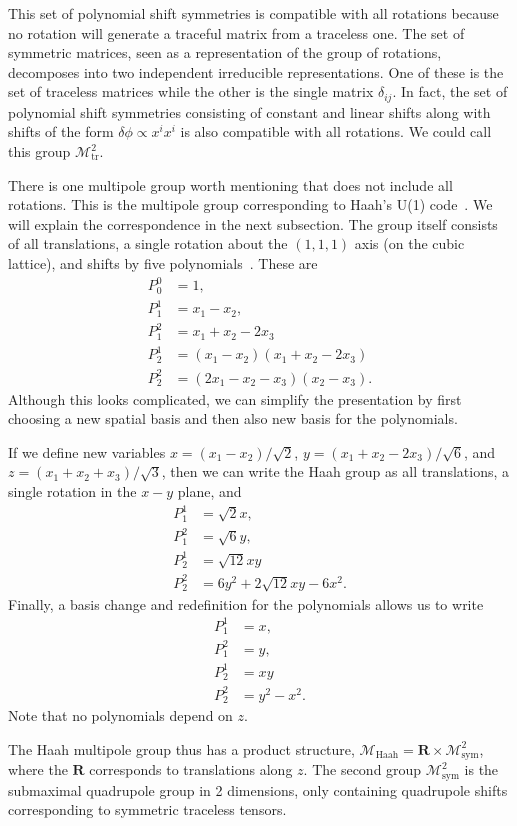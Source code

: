 \documentclass[pra,aps,twocolumn, amsfonts,amsmath,amssymb,nofootinbib,superscriptaddress]{revtex4-2}
\newcommand{\nn}{\nonumber\\}
\begin{document}
This set of polynomial shift symmetries is compatible with all rotations because no rotation will generate a traceful matrix from a traceless one. The set of symmetric matrices, seen as a representation of the group of rotations, decomposes into two independent irreducible representations. One of these is the set of traceless matrices while the other is the single matrix $\delta_{ij}$. In fact, the set of polynomial shift symmetries consisting of constant and linear shifts along with shifts of the form $\delta \phi \propto x^ix^i$ is also compatible with all rotations. We could call this group $\mathcal{M}^2_\text{tr}$.

There is one multipole group worth mentioning that does not include all rotations. This is the multipole group corresponding to Haah's U(1) code~\cite{Haah2017, BB, Gromov2019}. We will explain the correspondence in the next subsection. The group itself consists of all translations, a single rotation about the $(1,1,1)$ axis (on the cubic lattice), and shifts by five polynomials~\cite{Gromov2019}. These are
\begin{align}
P_0^0 &= 1, \nn
P_1^1 &= x_1 - x_2,\nn
P_1^2 &= x_1 + x_2 - 2x_3\nn
P_2^1 &= (x_1 - x_2) (x_1 + x_2 - 2x_3)\nn
P_2^2 &= (2x_1 - x_2 - x_3) (x_2 - x_3).
\end{align}
Although this looks complicated, we can simplify the presentation by first choosing a new spatial basis and then also new basis for the polynomials.

If we define new variables $x = (x_1 - x_2)/\sqrt{2}$, $y = (x_1 + x_2 - 2x_3)/\sqrt{6}$, and $z = (x_1 + x_2 + x_3)/\sqrt{3}$, then we can write the Haah group as all translations, a single rotation in the $x-y$ plane, and
\begin{align}
P_1^1 &= \sqrt{2} x , \nn
P_1^2 &= \sqrt{6} y, \nn
P_2^1 &= \sqrt{12} xy\nn
P_2^2 &= 6y^2 +2\sqrt{12} xy - 6x^2.
\end{align}
Finally, a basis change and redefinition for the polynomials allows us to write
\begin{align}
P_1^1 &= x , \nn
P_1^2 &= y, \nn
P_2^1 &= xy\nn
P_2^2 &= y^2 - x^2.
\end{align}
Note that no polynomials depend on $z$.

The Haah multipole group thus has a product structure, $\mathcal{M}_\text{Haah} = \mathbf{R} \times \mathcal{M}^2_\text{sym}$, where the $\mathbf{R}$ corresponds to translations along $z$. The second group $\mathcal{M}^2_\text{sym}$ is the submaximal quadrupole group in 2 dimensions, only containing quadrupole shifts corresponding to symmetric traceless tensors.
\end{document}
